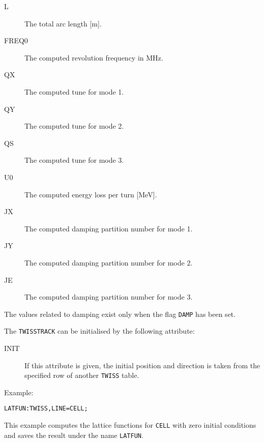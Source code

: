 \begin{description}
\item[L]
  The total arc length [m].
\item[FREQ0]
  The computed revolution frequency in MHz.
\item[QX]
  The computed tune for mode 1.
\item[QY]
  The computed tune for mode 2.
\item[QS]
  The computed tune for mode 3.
\item[U0]
  The computed energy loss per turn [MeV].
\item[JX]
  The computed damping partition number for mode 1.
\item[JY]
  The computed damping partition number for mode 2.
\item[JE]
  The computed damping partition number for mode 3.
\end{description}
The values related to damping exist only when the flag \texttt{DAMP}
has been set.

The \texttt{TWISSTRACK} can be initialised by the following attribute:
\begin{description}
\item[INIT]
  If this attribute is given, the initial position and direction is taken
  from the specified row of another \texttt{TWISS} table.
\end{description}

Example:
\begin{verbatim}
LATFUN:TWISS,LINE=CELL;
\end{verbatim}
This example computes the lattice functions for \texttt{CELL} with
zero initial conditions and saves the result under the name
\texttt{LATFUN}. 

